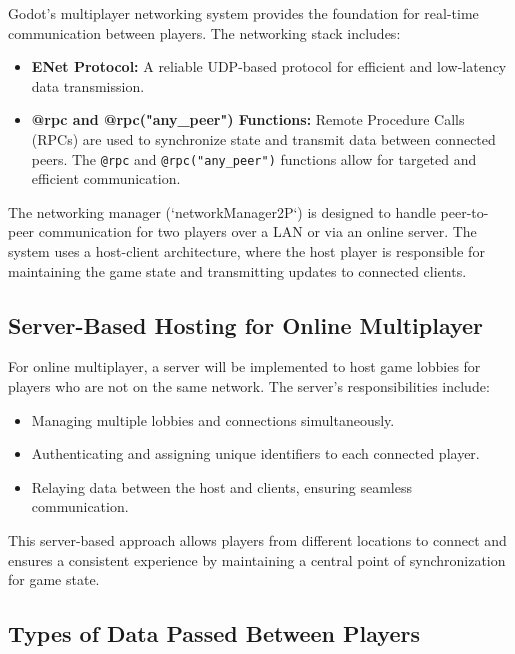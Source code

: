 \documentclass[12pt, titlepage]{article}
\begin{document}
Godot's multiplayer networking system provides the foundation for real-time communication between players. The networking stack includes:
\begin{itemize}
    \item \textbf{ENet Protocol:} A reliable UDP-based protocol for efficient and low-latency data transmission.
    \item \textbf{@rpc and @rpc("any\_peer") Functions:} Remote Procedure Calls (RPCs) are used to synchronize state and transmit data between connected peers. The \texttt{@rpc} and \texttt{@rpc("any\_peer")} functions allow for targeted and efficient communication.
\end{itemize}

The networking manager (`networkManager2P`) is designed to handle peer-to-peer communication for two players over a LAN or via an online server. The system uses a host-client architecture, where the host player is responsible for maintaining the game state and transmitting updates to connected clients.

\subsection{Server-Based Hosting for Online Multiplayer}

For online multiplayer, a server will be implemented to host game lobbies for players who are not on the same network. The server's responsibilities include:
\begin{itemize}
    \item Managing multiple lobbies and connections simultaneously.
    \item Authenticating and assigning unique identifiers to each connected player.
    \item Relaying data between the host and clients, ensuring seamless communication.
\end{itemize}

This server-based approach allows players from different locations to connect and ensures a consistent experience by maintaining a central point of synchronization for game state.

\subsection{Types of Data Passed Between Players}
\end{document}
